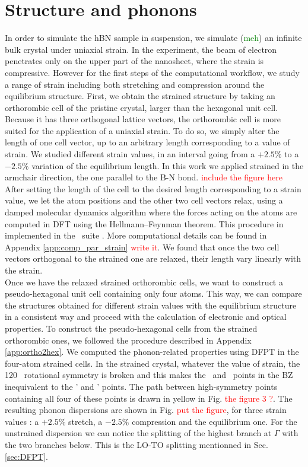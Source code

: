 \section{Structure and phonons}
In order to simulate the hBN sample in suspension, we simulate (\textcolor{green}{meh}) an infinite bulk crystal under uniaxial strain. In the experiment, the beam of electron penetrates only on the upper part of the nanosheet, where the strain is compressive. However for the first steps of the computational workflow, we study a range of strain including both stretching and compression around the equilibrium structure.
First, we obtain the strained structure by taking an orthorombic cell of the pristine crystal, larger than the hexagonal unit cell. Because it has three orthogonal lattice vectors, the orthorombic cell is more suited for the application of a uniaxial strain. To do so, we simply alter the length of one cell vector, up to an arbitrary length corresponding to a value of strain. We studied different strain values, in an interval going from a $+2.5\%$ to a $-2.5\%$ variation of the equilibrium length. In this work we applied strained in the armchair direction, the one parallel to the B-N bond. \textcolor{red}{include the figure here}
After setting the length of the cell to the desired length corresponding to a strain value, we let the atom positions and the other two cell vectors relax, using a damped molecular dynamics algorithm where the forces acting on the atoms are computed in \acrshort{DFT} using the Hellmann--Feynman theorem. This procedure in implemented in the \qe ~suite \cite{giannozzi2009quantum,giannozzi2017advanced}. More computational details can be found in Appendix \ref{app:comp_par_strain} \textcolor{red}{write it}. We found that once the two cell vectors orthogonal to the strained one are relaxed, their length vary linearly with the strain.\\
Once we have the relaxed strained orthorombic cells, we want to construct a pseudo-hexagonal unit cell containing only four atoms. This way, we can compare the structures obtained for different strain values with the equilibrium structure in a consistent way and proceed with the calculation of electronic and optical properties. To construct the pseudo-hexagonal cells from the strained orthorombic ones, we followed the procedure described in Appendix \ref{app:ortho2hex}. We computed the phonon-related properties using \acrshort{DFPT} in the four-atom strained cells. In the strained crystal, whatever the value of strain, the 120\textdegree~ rotational symmetry is broken and this makes the \MM~and \KK~points in the \acrshort{BZ} inequivalent to the \MM' and \KK' points. The path between high-symmetry points containing all four of these points is drawn in yellow in Fig. \textcolor{red}{the figure 3 ?}.
The resulting phonon dispersions are shown in Fig. \textcolor{red}{put the figure}, for three strain values : a $+2.5\%$ stretch, a $-2.5\%$ compression and the equilibrium one. 
For the unstrained dispersion we can notice the splitting of the highest branch at $\Gamma$ with the two branches below. This is the LO-TO splitting mentionned in Sec. \ref{sec:DFPT}.

